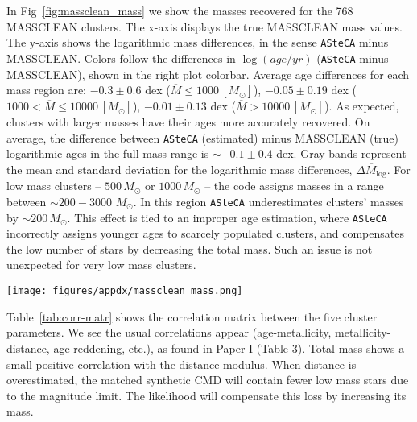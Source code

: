 \documentclass{aa}
\begin{document}
\begin{appendix}
In Fig~\ref{fig:massclean_mass} we show the masses recovered for the 768
MASSCLEAN clusters. The x-axis displays the true MASSCLEAN mass
values. The y-axis shows the logarithmic mass differences, in the sense \texttt
{ASteCA} minus MASSCLEAN.\@
%
Colors follow the differences in $\log(age/yr)$ (\texttt{ASteCA} minus
MASSCLEAN), shown in the right plot colorbar.
Average age differences for each mass region are: 
$-0.3{\pm}0.6$ dex ($\overline{M}{\le}1000\,[M_{\odot}]$),
$-0.05{\pm}0.19$ dex ($1000{<}\overline{M}{\le}10000\,[M_{\odot}]$),
$-0.01{\pm}0.13$ dex ($\overline{M}{>}10000\,[M_{\odot}]$).
As expected, clusters with larger masses have their ages more accurately
recovered. On average, the difference between \texttt{ASteCA} (estimated) minus
MASSCLEAN (true) logarithmic ages in the full mass range is ${\sim}-0.1{\pm}0.4$
dex.
%
Gray bands represent the mean and standard deviation for the logarithmic
mass differences, $\overline{\Delta M_{\log}}$.
%
For low mass clusters -- $500\,M_{\odot}$ or $1000\,M_{\odot}$ -- the
code assigns masses in a range between ${\sim}200{-}3000$ $M_{\odot}$.
In this region \texttt{ASteCA} underestimates clusters' masses by
${\sim}200\,M_{\odot}$. This effect is tied to an improper age estimation, where
\texttt{ASteCA} incorrectly assigns younger ages to scarcely populated clusters,
and compensates the low number of stars by decreasing the total mass. Such an
issue is not unexpected for very low mass clusters.

\begin{figure*}
\texttt{[image: figures/appdx/massclean\_mass.png]}
\caption{Recovered masses by \texttt{ASteCA} for the 768 MASSCLEAN clusters.
Logarithmic mass differences $\Delta M_{\log}$ are obtained in the sense
\texttt{ASteCA} minus MASSCLEAN, and shown in the y-axis. MASSCLEAN masses in
the x-axis are perturbed with a small random scatter.}
\label{fig:massclean_mass}
\end{figure*}

Table~\ref{tab:corr-matr} shows the correlation matrix between the five cluster
parameters. We see the usual correlations appear (age-metallicity,
metallicity-distance, age-reddening, etc.), as found in Paper I (Table 3).
Total mass shows a small positive correlation with the distance modulus.
When distance is overestimated, the matched synthetic CMD will contain fewer low
mass stars due to the magnitude limit. The likelihood will compensate this loss
by increasing its mass.


\end{appendix}
\end{document}
